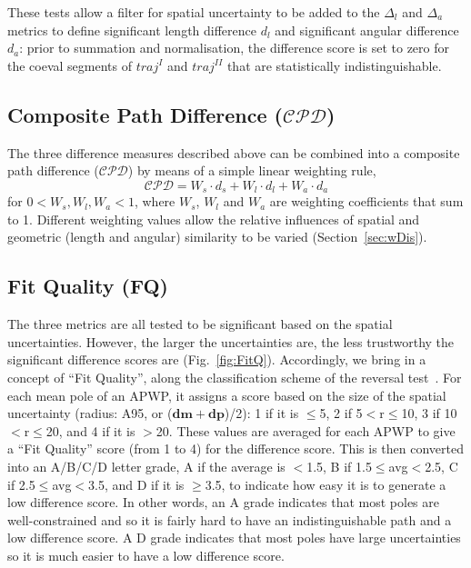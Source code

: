 These tests allow a filter for spatial uncertainty to be added to the $\Delta_l$
and $\Delta_a$ metrics to define significant length difference $d_l$ and
significant angular difference $d_a$: prior to summation and normalisation, the
difference score is set to zero for the coeval segments of $traj^I$ and
$traj^{II}$ that are statistically indistinguishable.

\subsection{Composite Path Difference ($\mathcal{CPD}$)}

The three difference measures described above can be combined into a composite
path difference ($\mathcal{CPD}$) by means of a simple linear weighting rule,
%
\begin{equation*}
\mathcal{CPD} = W_s \cdot d_s + W_l \cdot d_l + W_a \cdot d_a
\label{eq:cpd}
\end{equation*}
%
for $0 < W_s,W_l,W_a < 1$, where $W_s$, $W_l$ and $W_a$ are weighting
coefficients that sum to 1. Different weighting values allow the relative
influences of spatial and geometric (length and angular) similarity to be
varied (Section~\ref{sec:wDis}).

\subsection{Fit Quality (FQ)}\label{sec:FQ}

The three metrics are all tested to be significant based on the spatial
uncertainties. However, the larger the uncertainties are, the less trustworthy
the significant difference scores are (Fig.~\ref{fig:FitQ}). Accordingly, we
bring in a concept of ``Fit Quality'', along the classification scheme of the
reversal test~\citep{M90}. For each mean pole of an APWP, it assigns a score
based on the size of the spatial uncertainty (radius: A95, or
($\mathbf{dm}+\mathbf{dp}$)/2): 1 if
it is $\leq$5\degree, 2 if 5\degree$<$r$\leq$10\degree, 3 if
10\degree$<$r$\leq$20\degree, and 4 if it is $>$20\degree. These values are
averaged for each APWP to give a ``Fit Quality'' score (from 1 to 4) for the
difference score. This is then converted into an A/B/C/D letter grade, A if the
average is $<$1.5, B if 1.5$\leq$avg$<$2.5, C if 2.5$\leq$avg$<$3.5, and D if it
is $\geq$3.5, to indicate how easy it is to generate a low difference score. In
other words, an A grade indicates that most poles are well-constrained and so it
is fairly hard to have an indistinguishable path and a low difference score. A D
grade indicates that most poles have large uncertainties so it is much easier to
have a low difference score.

